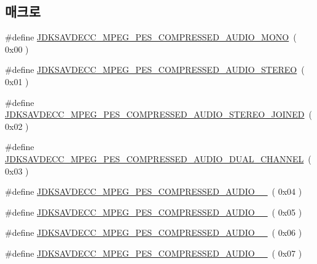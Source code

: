 \subsection*{매크로}
\begin{DoxyCompactItemize}
\item 
\#define \hyperlink{group__mpeg__pes__compressed__audio_ga194b8341ff9e0690cffbd92099fc3141}{J\+D\+K\+S\+A\+V\+D\+E\+C\+C\+\_\+\+M\+P\+E\+G\+\_\+\+P\+E\+S\+\_\+\+C\+O\+M\+P\+R\+E\+S\+S\+E\+D\+\_\+\+A\+U\+D\+I\+O\+\_\+\+M\+O\+NO}~( 0x00 )
\item 
\#define \hyperlink{group__mpeg__pes__compressed__audio_ga412b379568fe062f1b2de710d0a1c448}{J\+D\+K\+S\+A\+V\+D\+E\+C\+C\+\_\+\+M\+P\+E\+G\+\_\+\+P\+E\+S\+\_\+\+C\+O\+M\+P\+R\+E\+S\+S\+E\+D\+\_\+\+A\+U\+D\+I\+O\+\_\+\+S\+T\+E\+R\+EO}~( 0x01 )
\item 
\#define \hyperlink{group__mpeg__pes__compressed__audio_ga013d4e2e33c3842bb3238a97d5e50205}{J\+D\+K\+S\+A\+V\+D\+E\+C\+C\+\_\+\+M\+P\+E\+G\+\_\+\+P\+E\+S\+\_\+\+C\+O\+M\+P\+R\+E\+S\+S\+E\+D\+\_\+\+A\+U\+D\+I\+O\+\_\+\+S\+T\+E\+R\+E\+O\+\_\+\+J\+O\+I\+N\+ED}~( 0x02 )
\item 
\#define \hyperlink{group__mpeg__pes__compressed__audio_ga336aadbe023fa7508f174ebe3048a595}{J\+D\+K\+S\+A\+V\+D\+E\+C\+C\+\_\+\+M\+P\+E\+G\+\_\+\+P\+E\+S\+\_\+\+C\+O\+M\+P\+R\+E\+S\+S\+E\+D\+\_\+\+A\+U\+D\+I\+O\+\_\+\+D\+U\+A\+L\+\_\+\+C\+H\+A\+N\+N\+EL}~( 0x03 )
\item 
\#define \hyperlink{group__mpeg__pes__compressed__audio_ga14b837bc4c512944e1d5bf198afa9480}{J\+D\+K\+S\+A\+V\+D\+E\+C\+C\+\_\+\+M\+P\+E\+G\+\_\+\+P\+E\+S\+\_\+\+C\+O\+M\+P\+R\+E\+S\+S\+E\+D\+\_\+\+A\+U\+D\+I\+O\+\_\+\_}~( 0x04 )
\item 
\#define \hyperlink{group__mpeg__pes__compressed__audio_ga02a350f5e31e455168f118a5e213a461}{J\+D\+K\+S\+A\+V\+D\+E\+C\+C\+\_\+\+M\+P\+E\+G\+\_\+\+P\+E\+S\+\_\+\+C\+O\+M\+P\+R\+E\+S\+S\+E\+D\+\_\+\+A\+U\+D\+I\+O\+\_\+\_}~( 0x05 )
\item 
\#define \hyperlink{group__mpeg__pes__compressed__audio_ga2873023a28d227016d6dea72c3cd2eff}{J\+D\+K\+S\+A\+V\+D\+E\+C\+C\+\_\+\+M\+P\+E\+G\+\_\+\+P\+E\+S\+\_\+\+C\+O\+M\+P\+R\+E\+S\+S\+E\+D\+\_\+\+A\+U\+D\+I\+O\+\_\+\_}~( 0x06 )
\item 
\#define \hyperlink{group__mpeg__pes__compressed__audio_ga4b1aabf213bdc8a0ffdcc7d0a835e81e}{J\+D\+K\+S\+A\+V\+D\+E\+C\+C\+\_\+\+M\+P\+E\+G\+\_\+\+P\+E\+S\+\_\+\+C\+O\+M\+P\+R\+E\+S\+S\+E\+D\+\_\+\+A\+U\+D\+I\+O\+\_\+\_}~( 0x07 )
\item 

\end{DoxyCompactItemize}

